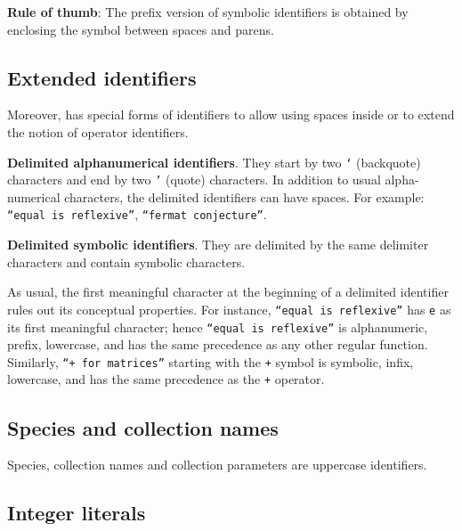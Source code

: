 {\bf Rule of thumb}: The prefix version of symbolic identifiers is obtained
by enclosing the symbol between spaces and parens.

\subsection{Extended identifiers}
\label{extended-identifiers}

Moreover, {\focal} has special forms of identifiers to allow using
spaces inside or to extend the notion of operator identifiers.
\begin{compact-itemize}
  \item {\bf Delimited alphanumerical identifiers}.
    They start by two {\tt `} (backquote) characters and end by two
    {\tt '} (quote) characters. In addition to usual alpha-numerical
    characters, the delimited identifiers can have spaces. For example:
    {\tt ``equal is reflexive''}, {\tt ``fermat conjecture''}.
  \item {\bf Delimited symbolic identifiers}.
    They are delimited by the same delimiter characters and contain
    symbolic characters.
\end{compact-itemize}

As usual, the first meaningful character at the beginning of a delimited
identifier rules out its conceptual properties. For instance,
{\tt ``equal is reflexive''} has {\tt e} as its first meaningful character; hence
{\tt ``equal is reflexive''} is alphanumeric, prefix, lowercase, and has the
same precedence as any other regular function.
Similarly, {\tt ``+ for matrices''} starting with the {\tt +} symbol is
symbolic, infix, lowercase, and has the same precedence as the {\tt +} operator.

\subsection{Species and collection names}
 Species, collection
names and collection parameters are uppercase identifiers.

\subsection{Integer literals}
\label{integer literals}
\label{octal}
\label{hexadecimal}
\label{binary}


